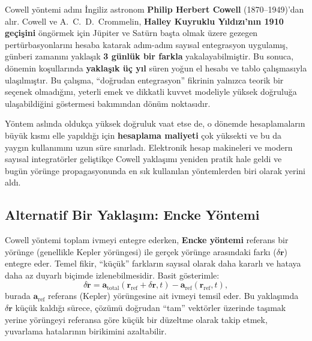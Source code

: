 \begin{tcolorbox}[
  colback=gray!10!white,
  colframe=black!75!black,
  title=\textbf{Tarihçe: Halley Kuyruklu Yıldızı ve Cowell'ın Yaklaşımı}
]
Cowell yöntemi adını İngiliz astronom \textbf{Philip Herbert Cowell} (1870--1949)'dan alır. Cowell ve A.\ C.\ D.\ Crommelin,
\textbf{Halley Kuyruklu Yıldızı'nın 1910 geçişini} öngörmek için Jüpiter ve Satürn başta olmak üzere gezegen pertürbasyonlarını
hesaba katarak adım-adım sayısal entegrasyon uygulamış, günberi zamanını yaklaşık \textbf{3 günlük bir farkla} yakalayabilmiştir.
Bu sonuca, dönemin koşullarında \textbf{yaklaşık üç yıl} süren yoğun el hesabı ve tablo çalışmasıyla ulaşılmıştır. Bu çalışma,
``doğrudan entegrasyon'' fikrinin yalnızca teorik bir seçenek olmadığını, yeterli emek ve dikkatli kuvvet modeliyle
yüksek doğruluğa ulaşabildiğini göstermesi bakımından dönüm noktasıdır.

\medskip
Yöntem aslında oldukça yüksek doğruluk vaat etse de, o dönemde hesaplamaların büyük kısmı elle yapıldığı için
\textbf{hesaplama maliyeti} çok yüksekti ve bu da yaygın kullanımını uzun süre sınırladı. Elektronik hesap makineleri ve
modern sayısal integratörler geliştikçe Cowell yaklaşımı yeniden pratik hale geldi ve bugün yörünge propagasyonunda
en sık kullanılan yöntemlerden biri olarak yerini aldı.

\end{tcolorbox}

\subsection{Alternatif Bir Yaklaşım: Encke Yöntemi}

Cowell yöntemi toplam ivmeyi entegre ederken, \textbf{Encke yöntemi} referans bir yörünge (genellikle Kepler yörüngesi)
ile gerçek yörünge arasındaki farkı ($\delta\mathbf{r}$) entegre eder. Temel fikir, ``küçük'' farkların sayısal olarak
daha kararlı ve hataya daha az duyarlı biçimde izlenebilmesidir. Basit gösterimle:
\begin{equation}
\delta \ddot{\mathbf{r}}
= \mathbf{a}_{\text{total}}(\mathbf{r}_{\text{ref}}+\delta\mathbf{r},t) - \mathbf{a}_{\text{ref}}(\mathbf{r}_{\text{ref}},t),
\end{equation}
burada $\mathbf{a}_{\text{ref}}$ referans (Kepler) yörüngesine ait ivmeyi temsil eder. Bu yaklaşımda $\delta\mathbf{r}$
küçük kaldığı sürece, çözümü doğrudan ``tam'' vektörler üzerinde taşımak yerine yörüngeyi referansa göre küçük bir düzeltme
olarak takip etmek, yuvarlama hatalarının birikimini azaltabilir.


